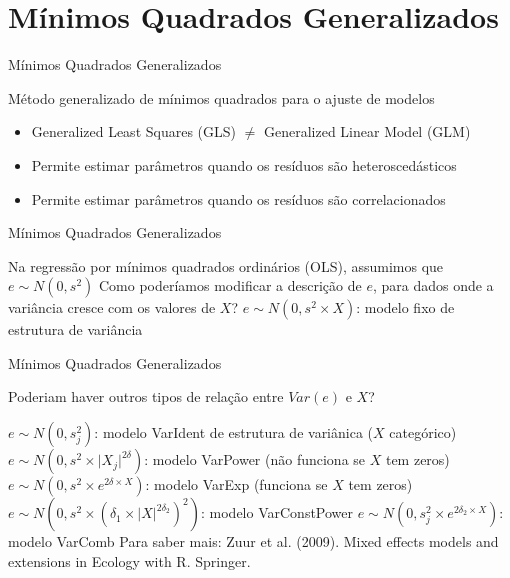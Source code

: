 \documentclass{beamer}\usepackage[]{graphicx}\usepackage[]{color}
\begin{document}
\section{Mínimos Quadrados Generalizados}

\begin{frame}{Mínimos Quadrados Generalizados}

Método generalizado de mínimos quadrados para o ajuste de modelos
\vfill
\begin{itemize}
\item Generalized Least Squares (GLS) $\ne$ Generalized Linear Model (GLM)
\vfill
\item Permite estimar parâmetros quando os resíduos são heteroscedásticos
\vfill
\item Permite estimar parâmetros quando os resíduos são correlacionados
\vfill
\end{itemize}

\end{frame}


\begin{frame}{Mínimos Quadrados Generalizados}

Na regressão por mínimos quadrados ordinários (OLS), assumimos que $e \sim N(0,s^2)$
\vfill
Como poderíamos modificar a descrição de $e$, para dados onde a variância cresce com os valores de $X$? \pause
\vfill
$e \sim N(0,s^2 \times X)$: modelo fixo de estrutura de variância \pause


\end{frame}


\begin{frame}{Mínimos Quadrados Generalizados}

Poderiam haver outros tipos de relação entre $Var(e)$ e $X$? \pause

\small
\vfill
$e \sim N(0,s^2_j)$: modelo VarIdent de estrutura de variânica ($X$ categórico) \pause
\vfill
$e \sim N(0,s^2 \times \lvert X_j \rvert ^{2\delta})$: modelo VarPower (não funciona se $X$ tem zeros) \pause
\vfill
$e \sim N(0,s^2 \times e^{2\delta \times X})$: modelo VarExp (funciona se $X$ tem zeros) \pause
\vfill
$e \sim N(0,s^2 \times (\delta_1 \times \lvert X \rvert ^{2\delta_2})^2)$: modelo VarConstPower \pause
\vfill
$e \sim N(0,s^2_j \times e^{2\delta_2 \times X})$: modelo VarComb \pause
\vfill
\scriptsize
Para saber mais: Zuur et al. (2009). Mixed effects models and extensions in Ecology with R. Springer.

\end{frame}
\end{document}
